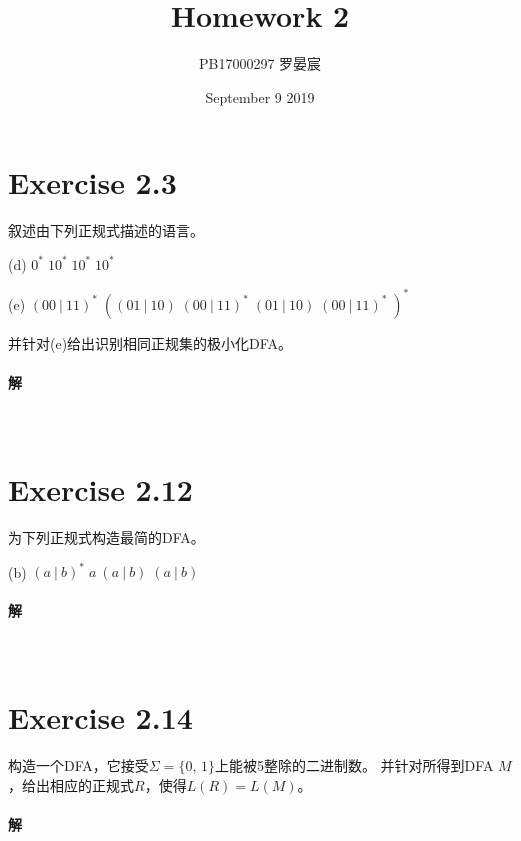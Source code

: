 \documentclass{article}
\title{Homework 2}
\author{PB17000297 罗晏宸}
\date{September 9 2019}
\begin{document}
\maketitle

\section{Exercise 2.3}
叙述由下列正规式描述的语言。\par
(d) $0^*\;10^*\;10^*\;10^*$\par
(e) $(00\ |\ 11)^*\;((01\ |\ 10)\;(00\ |\ 11)^*\;(01\ |\ 10)\;(00\ |\ 11)^*\;)^*$\par
并针对(e)给出识别相同正规集的极小化DFA。
\\

\paragraph{解}
\\

\section{Exercise 2.12}
为下列正规式构造最简的DFA。\par
(b) $(a\ |\ b)^*\;a\ (a\ |\ b)\;(a\ |\ b)$
\\

\paragraph{解}
\\

\section{Exercise 2.14}
构造一个DFA，它接受$\Sigma=\{0,\,1\}$上能被5整除的二进制数。
并针对所得到DFA $M$，给出相应的正规式$R$，使得$L(R) = L(M)$。

\paragraph{解}
\\
\end{document}
